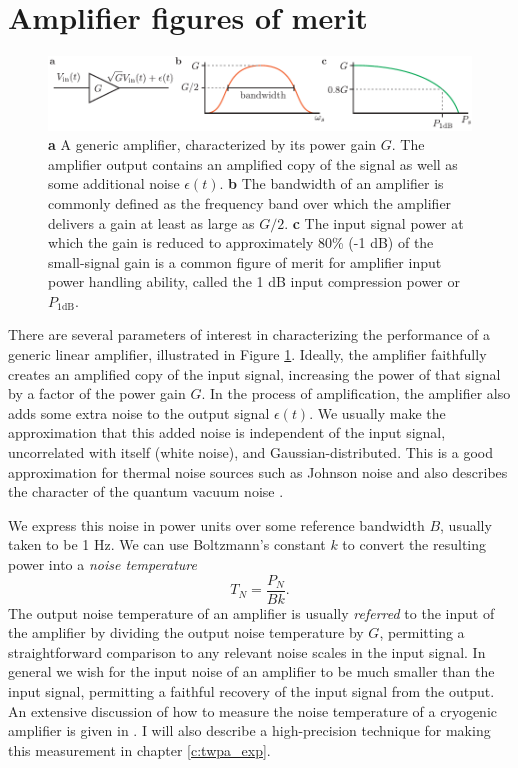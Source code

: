 \section{Amplifier figures of merit}\label{s:amp_figures_of_merit}

\begin{figure}
\begin{center}
	\includegraphics[width = 6in]{paramps_chapter/amp_metrics}
\end{center}
\caption[Amplifier performance metrics]{\textbf{a} A generic amplifier, characterized by its power gain $G$.  The amplifier output contains an amplified copy of the signal as well as some additional noise $\epsilon(t)$.  \textbf{b} The bandwidth of an amplifier is commonly defined as the frequency band over which the amplifier delivers a gain at least as large as $G/2$.  \textbf{c} The input signal power at which the gain is reduced to approximately 80\% (-1 dB) of the small-signal gain is a common figure of merit for amplifier input power handling ability, called the 1 dB input compression power or $P_\textrm{1dB}$.}
\label{fig:amp_metrics}
\end{figure}

There are several parameters of interest in characterizing the performance of a generic linear amplifier, illustrated in Figure \ref{fig:amp_metrics}.  Ideally, the amplifier faithfully creates an amplified copy of the input signal, increasing the power of that signal by a factor of the power gain $G$.  In the process of amplification, the amplifier also adds some extra noise to the output signal $\epsilon(t)$.  We usually make the approximation that this added noise is independent of the input signal, uncorrelated with itself (white noise), and Gaussian-distributed.  This is a good approximation for thermal noise sources such as Johnson noise and also describes the character of the quantum vacuum noise \cite{clerk_revmod}.

We express this noise in power units over some reference bandwidth $B$, usually taken to be 1 Hz.  We can use Boltzmann's constant $k$  to convert the resulting power into a \textit{noise temperature}
\begin{equation}
T_N = \frac{P_N}{B k}.
\label{eq:Tnoise}
\end{equation}
The output noise temperature of an amplifier is usually \textit{referred} to the input of the amplifier by dividing the output noise temperature by $G$, permitting a straightforward comparison to any relevant noise scales in the input signal.  In general we wish for the input noise of an amplifier to be much smaller than the input signal, permitting a faithful recovery of the input signal from the output.  An extensive discussion of how to measure the noise temperature of a cryogenic amplifier is given in \cite{slichterthesis}.  I will also describe a high-precision technique for making this measurement in chapter \ref{c:twpa_exp}.

